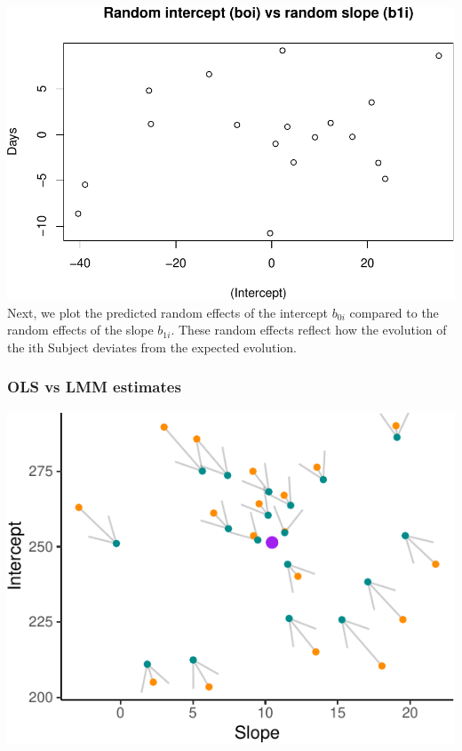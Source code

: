 \documentclass[
]{article}
\begin{document}
\includegraphics{common_sleep_files/figure-latex/unnamed-chunk-8-1.pdf}
Next, we plot the predicted random effects of the intercept \(b_{0i}\)
compared to the random effects of the slope \(b_{1i}\). These random
effects reflect how the evolution of the ith Subject deviates from the
expected evolution.

\hypertarget{ols-vs-lmm-estimates}{%
\subsubsection{OLS vs LMM estimates}\label{ols-vs-lmm-estimates}}

\begin{center}\includegraphics{common_sleep_files/figure-latex/unnamed-chunk-9-1} \end{center}
\end{document}
